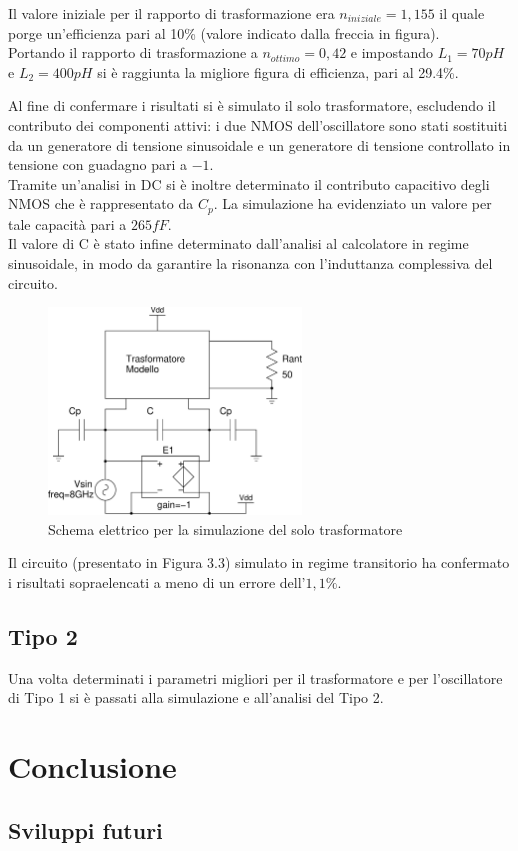 \documentclass[a4paper, 12pt]{memoir}
\begin{document}
Il valore iniziale per il rapporto di trasformazione era $n_{iniziale}=1,155$
il quale porge un'efficienza pari al 10\% (valore indicato dalla freccia in
figura).\\
Portando il rapporto di trasformazione a $n_{ottimo}=0,42$ e impostando
$L_1=70pH$ e $L_2=400pH$ si è raggiunta la migliore figura di efficienza, pari
al 29.4\%.

Al fine di confermare i risultati si è simulato il solo trasformatore,
escludendo il contributo dei componenti attivi: i due NMOS dell'oscillatore
sono stati sostituiti da un generatore di tensione sinusoidale e un generatore
di tensione controllato in tensione con guadagno pari a $-1$.\\
Tramite un'analisi in DC si è inoltre determinato il contributo capacitivo
degli NMOS che è rappresentato da $C_p$. La simulazione ha evidenziato un
valore per tale capacità pari a $265fF$.\\
Il valore di C è stato infine determinato dall'analisi al calcolatore in regime
sinusoidale, in modo da garantire la risonanza con l'induttanza complessiva del
circuito.
\begin{figure}[h!]
\centering
\includegraphics[width=0.6\textwidth]{images/trasf_sim.pdf}
\caption{Schema elettrico per la simulazione del solo trasformatore}
\end{figure}

\noindent Il circuito (presentato in Figura 3.3) simulato in regime
transitorio ha confermato i risultati sopraelencati a meno di un errore 
dell'$1,1\%$.

\section{Tipo 2}
Una volta determinati i parametri migliori per il trasformatore e per 
l'oscillatore di Tipo 1 si è passati alla simulazione e all'analisi del Tipo 2.

\cleardoublepage{}
\chapter{Conclusione}

\section{Sviluppi futuri}



\end{document}
